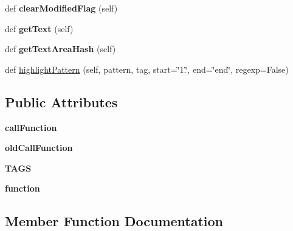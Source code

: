 \begin{DoxyCompactItemize}
\mbox{\label{class_python_01_g_u_i_1_1appjar_1_1_text_parent_a2e49a3c2e5577669261bb6f647cbeab6}} 
def {\bfseries clear\+Modified\+Flag} (self)
\item 
\mbox{\label{class_python_01_g_u_i_1_1appjar_1_1_text_parent_a3b0a54913cb67ed76072ae868ac10354}} 
def {\bfseries get\+Text} (self)
\item 
\mbox{\label{class_python_01_g_u_i_1_1appjar_1_1_text_parent_a9b25bcb904b552b3e5337cc2db35e740}} 
def {\bfseries get\+Text\+Area\+Hash} (self)
\item 
def \hyperlink{class_python_01_g_u_i_1_1appjar_1_1_text_parent_af638d9c40459a89dbb626ec49b1b356f}{highlight\+Pattern} (self, pattern, tag, start=\char`\"{}1.\char`\"{}, end=\char`\"{}end\char`\"{}, regexp=False)
\end{DoxyCompactItemize}
\subsection*{Public Attributes}
\begin{DoxyCompactItemize}
\item 
\mbox{\label{class_python_01_g_u_i_1_1appjar_1_1_text_parent_a2ba062356c3acf697b56d37b26b36587}} 
{\bfseries call\+Function}
\item 
\mbox{\label{class_python_01_g_u_i_1_1appjar_1_1_text_parent_a23e0741e1cb60451d234ed568d24c9b5}} 
{\bfseries old\+Call\+Function}
\item 
\mbox{\label{class_python_01_g_u_i_1_1appjar_1_1_text_parent_a08673779c6954aab42ac9ad9acf52a0a}} 
{\bfseries T\+A\+GS}
\item 
\mbox{\label{class_python_01_g_u_i_1_1appjar_1_1_text_parent_a3603402e017c5ceec53fdab47adfefd1}} 
{\bfseries function}
\end{DoxyCompactItemize}


\subsection{Member Function Documentation}
\mbox{\label{class_python_01_g_u_i_1_1appjar_1_1_text_parent_af638d9c40459a89dbb626ec49b1b356f}} 
